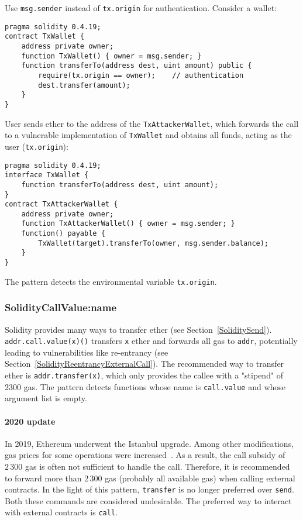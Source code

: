 Use \texttt{msg.sender} instead of \texttt{tx.origin} for authentication.
Consider a wallet:

\begin{lstlisting}[language=Solidity]
pragma solidity 0.4.19;
contract TxWallet {
    address private owner;
    function TxWallet() { owner = msg.sender; }
    function transferTo(address dest, uint amount) public {
        require(tx.origin == owner);	// authentication
        dest.transfer(amount);
    }
}
\end{lstlisting}

User sends ether to the address of the \texttt{TxAttackerWallet}, which forwards the call to a vulnerable implementation of \texttt{TxWallet} and obtains all funds, acting as the user (\texttt{tx.origin}):

\begin{lstlisting}[language=Solidity]
pragma solidity 0.4.19;
interface TxWallet {
    function transferTo(address dest, uint amount);
}
contract TxAttackerWallet {
    address private owner;
    function TxAttackerWallet() { owner = msg.sender; }
    function() payable {
        TxWallet(target).transferTo(owner, msg.sender.balance);
    }
}
\end{lstlisting}

The pattern detects the environmental variable \texttt{tx.origin}.

\subsubsection{\let\letcs\texapiletcs \usevalue SolidityCallValue:name \let\letcs\etoolboxletcs} \label{SolidityCallValue}

Solidity provides many ways to transfer ether (see Section~\ref{SoliditySend}).
\texttt{addr.call.value(x)()} transfers \texttt{x} ether and forwards all gas to \texttt{addr}, potentially leading to vulnerabilities like re-entrancy (see Section~\ref{SolidityReentrancyExternalCall}).
The recommended way to transfer ether is \texttt{addr.transfer(x)}, which only provides the callee with a "stipend" of 2300 gas.
The pattern detects functions whose name is \texttt{call.value} and whose argument list is empty.

\paragraph{2020 update}
In 2019, Ethereum underwent the Istanbul upgrade.
Among other modifications, gas prices for some operations were increased~\cite{EIP1884}.
As a result, the call subsidy of $2\,300$ gas is often not sufficient to handle the call.
Therefore, it is recommended to forward more than $2\,300$ gas (probably all available gas) when calling external contracts.
In the light of this pattern, \texttt{transfer} is no longer preferred over \texttt{send}.
Both these commands are considered undesirable.
The preferred way to interact with external contracts is \texttt{call}.


